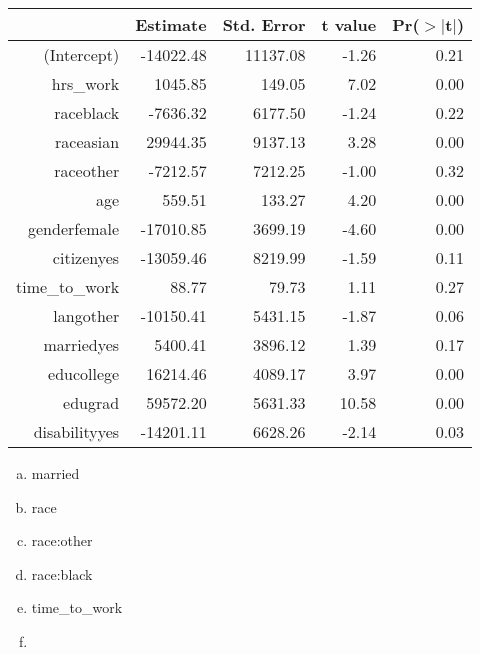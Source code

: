 \documentclass[11pt,containsverbatim,handout,xcolor=xelatex,dvipsnames,table]{beamer}
\newcommand{\solnMult}[1]{#1}
\begin{document}

\begin{frame}
\frametitle{}


\begin{center}
{\tiny
\begin{tabular}{rrrrr}
  \hline
 & Estimate & Std. Error & t value & Pr($>$$|$t$|$) \\ 
  \hline
(Intercept) & -14022.48 & 11137.08 & -1.26 & 0.21 \\ 
  hrs\_work & 1045.85 & 149.05 & 7.02 & 0.00 \\ 
  raceblack & -7636.32 & 6177.50 & -1.24 & 0.22 \\ 
  raceasian & 29944.35 & 9137.13 & 3.28 & 0.00 \\ 
  raceother & -7212.57 & 7212.25 & -1.00 & 0.32 \\ 
  age & 559.51 & 133.27 & 4.20 & 0.00 \\ 
  genderfemale & -17010.85 & 3699.19 & -4.60 & 0.00 \\ 
  citizenyes & -13059.46 & 8219.99 & -1.59 & 0.11 \\ 
  time\_to\_work & 88.77 & 79.73 & 1.11 & 0.27 \\ 
  langother & -10150.41 & 5431.15 & -1.87 & 0.06 \\ 
  marriedyes & 5400.41 & 3896.12 & 1.39 & 0.17 \\ 
  educollege & 16214.46 & 4089.17 & 3.97 & 0.00 \\ 
  edugrad & 59572.20 & 5631.33 & 10.58 & 0.00 \\ 
  disabilityyes & -14201.11 & 6628.26 & -2.14 & 0.03 \\ 
   \hline
\end{tabular}
}
\end{center}

\begin{multicols}{2}
\begin{enumerate}[(a)]
\item married
\item race
\item race:other
\item race:black
\item \solnMult{time\_to\_work}
\item[]
\end{enumerate}
\end{multicols}

\end{frame}
\end{document}
